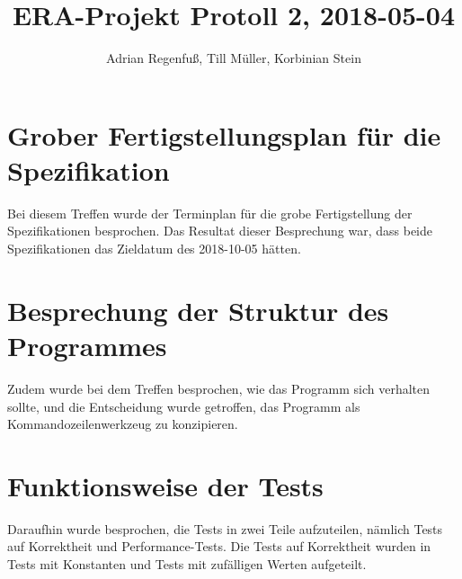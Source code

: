 \documentclass{article}
\title{ERA-Projekt Protoll 2, 2018-05-04}
\author{Adrian Regenfuß, Till Müller, Korbinian Stein}
\begin{document}
\maketitle

\section{Grober Fertigstellungsplan für die Spezifikation}

Bei diesem Treffen wurde der Terminplan für die grobe Fertigstellung
der Spezifikationen besprochen. Das Resultat dieser Besprechung war,
dass beide Spezifikationen das Zieldatum des 2018-10-05 hätten.

\section{Besprechung der Struktur des Programmes}

Zudem wurde bei dem Treffen besprochen, wie das Programm sich
verhalten sollte, und die Entscheidung wurde getroffen, das Programm
als Kommandozeilenwerkzeug zu konzipieren.

\section{Funktionsweise der Tests}

Daraufhin wurde besprochen, die Tests in zwei Teile aufzuteilen,
nämlich Tests auf Korrektheit und Performance-Tests. Die Tests
auf Korrektheit wurden in Tests mit Konstanten und Tests mit
zufälligen Werten aufgeteilt.
\end{document}
